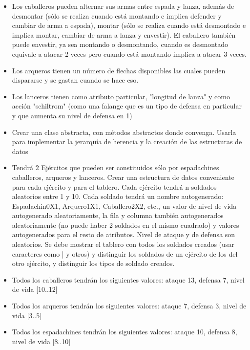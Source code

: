 \documentclass{article}
\begin{document}
\begin{itemize}
        \item Los caballeros pueden alternar sus armas entre espada y lanza, además de desmontar (sólo se realiza cuando está montando e implica defender y cambiar de arma a espada), montar (sólo se realiza cuando está desmontado e implica montar, cambiar de arma a lanza y envestir). El caballero también puede envestir, ya sea montando o desmontando, cuando es desmontado equivale a atacar 2 veces pero cuando está montando implica a atacar 3 veces.

        \item Los arqueros tienen un número de flechas disponibles las cuales pueden dispararse y se gastan cuando se hace eso.

        \item Los lanceros tienen como atributo particular, "longitud de lanza" y como acción "schiltrom" (como una falange que es un tipo de defensa en particular y que aumenta su nivel de defensa en 1)

        \item Crear una clase abstracta, con métodos abstractos donde convenga. Usarla para implementar la jerarquía de herencia y la creación de las estructuras de datos

        \item Tendrá 2 Ejércitos que pueden ser constituidos sólo por espadachines caballeros, arqueros y lanceros. Crear una estructura de datos conveniente para cada ejército y para el tablero. Cada ejército tendrá n soldados aleatorios entre 1 y 10. Cada soldado tendrá un nombre autogenerado: Espadachin0X1, Arquero1X1, Caballero2X2, etc., un valor de nivel de vida autogenerado aleatoriamente, la fila y columna también autogenerados aleatoriamente (no puede haber 2 soldados en el mismo cuadrado) y valores autogenerados para el resto de atributos. Nivel de ataque y de defensa son aleatorios. Se debe mostrar el tablero con todos los soldados creados (usar caracteres como |  y otros) y distinguir los soldados de un ejército de los del otro ejército, y distinguir los tipos de soldado creados.
        
        \item Todos los caballeros tendrán los siguientes valores: ataque 13, defensa 7, nivel de vida [10..12]

        \item Todos los arqueros tendrán los siguientes valores: ataque 7, defensa 3, nivel de vida [3..5]
        
        \item Todos los espadachines tendrán los siguientes valores: ataque 10, defensa 8, nivel de vida [8..10]


\end{itemize}
\end{document}
